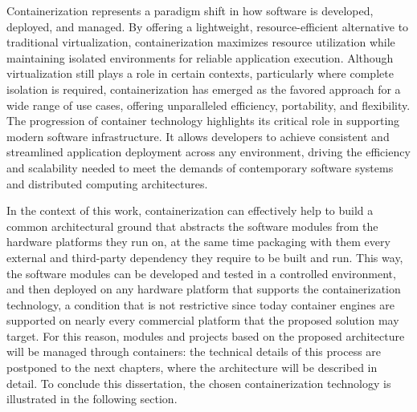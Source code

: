 Containerization represents a paradigm shift in how software is developed, deployed, and managed. By offering a lightweight, resource-efficient alternative to traditional virtualization, containerization maximizes resource utilization while maintaining isolated environments for reliable application execution. Although virtualization still plays a role in certain contexts, particularly where complete isolation is required, containerization has emerged as the favored approach for a wide range of use cases, offering unparalleled efficiency, portability, and flexibility. The progression of container technology highlights its critical role in supporting modern software infrastructure. It allows developers to achieve consistent and streamlined application deployment across any environment, driving the efficiency and scalability needed to meet the demands of contemporary software systems and distributed computing architectures.

In the context of this work, containerization can effectively help to build a common architectural ground that abstracts the software modules from the hardware platforms they run on, at the same time packaging with them every external and third-party dependency they require to be built and run. This way, the software modules can be developed and tested in a controlled environment, and then deployed on any hardware platform that supports the containerization technology, a condition that is not restrictive since today container engines are supported on nearly every commercial platform that the proposed solution may target. For this reason, modules and projects based on the proposed architecture will be managed through containers: the technical details of this process are postponed to the next chapters, where the architecture will be described in detail. To conclude this dissertation, the chosen containerization technology is illustrated in the following section.

